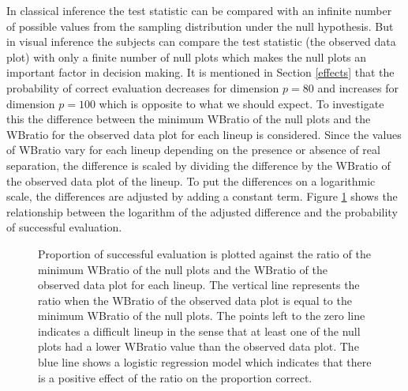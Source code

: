 \documentclass[12]{article}
\begin{document}
In classical inference the test statistic can be compared with an infinite number of possible values from the sampling distribution under the null hypothesis. But in visual inference the subjects can compare the test statistic (the observed data plot) with only a finite number of null plots which makes the null plots an important factor in decision making. It is mentioned in Section \ref{effects} that the probability of correct evaluation decreases for dimension $p = 80$ and increases for dimension $p = 100$ which is opposite to what we should expect. To investigate this the difference between the minimum WBratio of the null plots and the WBratio for the observed data plot for each lineup is considered. Since the values of WBratio vary for each lineup depending on the presence or absence of real separation, the difference is scaled by dividing the difference by the WBratio of the observed data plot of the lineup. To put the differences on a logarithmic scale, the differences are adjusted by adding a constant term. Figure \ref{null} shows the relationship between the logarithm of the adjusted difference and the probability of successful evaluation.  

\begin{figure}[hbtp]
   \centering
       \caption{Proportion of successful evaluation is plotted against the ratio of the minimum WBratio of the null plots and the WBratio of the observed data plot for each lineup. The vertical line represents the ratio when the WBratio of the observed data plot is equal to the minimum WBratio of the null plots. The points left to the zero line indicates a difficult lineup in the sense that at least one of the null plots had a lower WBratio value than the observed data plot. The blue line shows a logistic regression model which indicates that there is a positive effect of the ratio on the proportion correct.}
       \label{null}
\end{figure}
\end{document}

